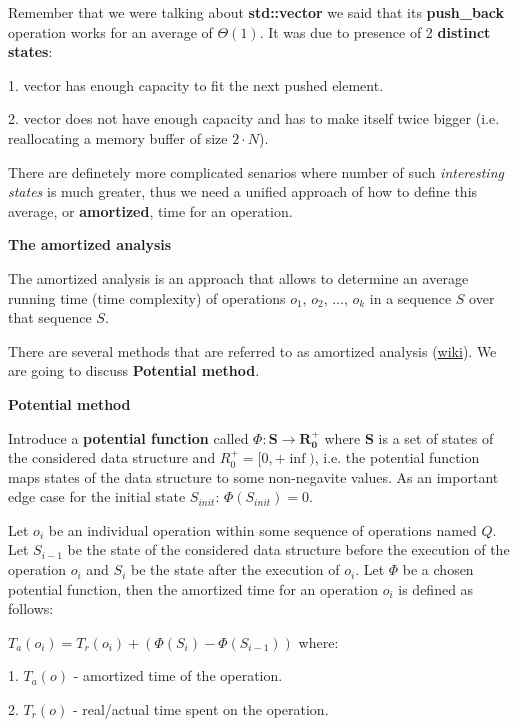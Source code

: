 
Remember that we were talking about \textbf{std::vector} we said that its \textbf{push\_back} operation works for an average of $\Theta(1)$. It was due to presence of 2 \textbf{distinct states}:

1. vector has enough capacity to fit the next pushed element.

2. vector does not have enough capacity and has to make itself twice bigger (i.e. reallocating a memory buffer of size $2\cdot N$).

There are definetely more complicated senarios where number of such \textit{interesting states} is much greater, thus we need a unified approach of how to define this average, or \textbf{amortized}, time for an operation.

\begin{definition}
    \textbf{The amortized analysis}

    The amortized analysis is an approach that allows to determine an average running time (time complexity) of operations $o_1$, $o_2$, ..., $o_k$ in a sequence $S$ over that sequence $S$.

\end{definition}

There are several methods that are referred to as amortized analysis (\href{https://en.wikipedia.org/wiki/Amortized_analysis}{wiki}). We are going to discuss \textbf{Potential method}.


\begin{definition}
    \textbf{Potential method}


    Introduce a \textbf{potential function} called $\Phi: \mathbf{S} \to \mathbf{R_{0}^{+}}$ where $\mathbf{S}$ is a set of states of the considered data structure and $R_{0}^{+} = [0, +\inf)$, i.e. the potential function maps states of the data structure to some non-negavite values. As an important edge case for the initial state $S_{init}$: $\Phi(S_{init}) = 0$.

    Let $o_i$ be an individual operation within some sequence of operations named $Q$. Let $S_{i-1}$ be the state of the considered data structure before the execution of the operation $o_i$ and $S_{i}$ be the state after the execution of $o_i$. Let $\Phi$ be a chosen potential function, then the amortized time for an operation $o_i$ is defined as follows:

    $ T_{a}(o_i) = T_{r}(o_i) + \left (\Phi(S_{i}) - \Phi(S_{i-1}) \right ) $ where:

    1. $T_{a}(o)$ - amortized time of the operation.

    2. $T_{r}(o)$ - real/actual time spent on the operation.
\end{definition}

